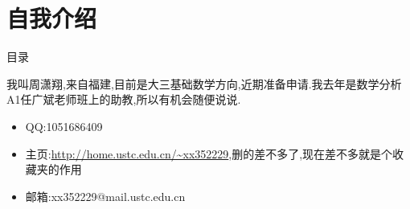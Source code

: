 \documentclass[pdf]{beamer}
\numberwithin{equation}{section}
\theoremstyle{plain}
\theoremstyle{plain}
\theoremstyle{plain}
\theoremstyle{remark}
\begin{document}
\section{自我介绍}
\begin{frame}{目录}
\tableofcontents[currentsection]
\end{frame}
\begin{frame}
	\hspace*{20pt}我叫周潇翔,来自福建,目前是大三基础数学方向,近期准备申请.我去年是数学分析A1任广斌老师班上的助教,所以有机会随便说说.
	\begin{itemize}
		\item QQ:1051686409
		\item 主页:\url{http://home.ustc.edu.cn/~xx352229},删的差不多了,现在差不多就是个收藏夹的作用
		\item 邮箱:xx352229@mail.ustc.edu.cn
	\end{itemize}
\end{frame}
\end{document}

